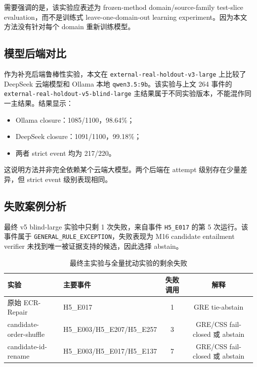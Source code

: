 \documentclass[11pt]{article}
\begin{document}
需要强调的是，该实验应表述为 frozen-method domain/source-family test-slice evaluation，而不是训练式 leave-one-domain-out learning experiment。因为本文方法没有针对每个 domain 重新训练模型。

\subsection{模型后端对比}

作为补充后端鲁棒性实验，本文在 \texttt{external-real-holdout-v3-large} 上比较了 DeepSeek 云端模型和 Ollama 本地 \texttt{qwen3.5:9b}。该实验与上文 264 事件的 \texttt{external-real-holdout-v5-blind-large} 主结果属于不同实验版本，不能混作同一主结果。结果显示：

\begin{itemize}
    \item Ollama closure：1085/1100，98.64\%；
    \item DeepSeek closure：1091/1100，99.18\%；
    \item 两者 strict event 均为 217/220。
\end{itemize}

这说明方法并非完全依赖某个云端大模型。两个后端在 attempt 级别存在少量差异，但 strict event 级别表现相同。

\subsection{失败案例分析}

最终 v5 blind-large 实验中只剩 1 次失败，来自事件 \texttt{H5\_E017} 的第 5 次运行。该事件属于 \texttt{GENERAL\_RULE\_EXCEPTION}，失败表现为 M16 candidate entailment verifier 未找到唯一被证据支持的候选，因此选择 abstain。

\begin{table}[t]
\centering
\caption{最终主实验与全量扰动实验的剩余失败}
\label{tab:failures}
\begin{tabular}{llcc}
\toprule
实验 & 主要事件 & 失败调用 & 解释 \\
\midrule
原始 ECR-Repair & H5\_E017 & 1 & GRE tie-abstain \\
candidate-order-shuffle & H5\_E003/H5\_E207/H5\_E257 & 3 & GRE/CSS fail-closed 或 abstain \\
candidate-id-rename & H5\_E003/H5\_E017/H5\_E137 & 7 & GRE/CSS fail-closed 或 abstain \\
\bottomrule
\end{tabular}
\end{table}
\end{document}
